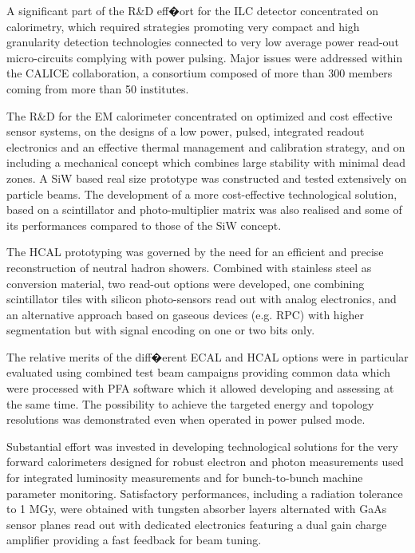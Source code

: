 \documentclass[%
 reprint,
 amsmath,amssymb,
 aps,
]{revtex4-1}
\begin{document}
A significant part of the R\&D eff�ort for the ILC detector concentrated on calorimetry, which required strategies promoting very compact and high granularity detection technologies connected to very low average power read-out micro-circuits complying with power pulsing. Major issues were addressed within the CALICE collaboration, a consortium composed of more than 300 members coming from more than 50 institutes.

The R\&D for the EM calorimeter concentrated on optimized and cost effective sensor systems, on the designs of a low power, pulsed, integrated readout electronics and an effective thermal management and calibration strategy, and on including a mechanical concept which combines large stability with minimal dead zones. A SiW based real size prototype was constructed and tested extensively on particle beams. The development of a more cost-effective technological solution, based on a scintillator and photo-multiplier matrix was also realised and some of its performances compared to those of the SiW concept.

The HCAL prototyping was governed by the need for an efficient and precise reconstruction of neutral hadron showers. Combined with stainless steel as conversion material, two read-out options were developed, one combining scintillator tiles with silicon photo-sensors read out with analog electronics, and an alternative approach based on gaseous devices (e.g. RPC) with higher segmentation but with signal encoding on one or two bits only.

The relative merits of the diff�erent ECAL and HCAL options were in particular evaluated using combined test beam campaigns providing common data which were processed with PFA software which it allowed developing and assessing at the same time. The possibility to achieve the targeted energy and topology resolutions was demonstrated even when operated in power pulsed mode.

Substantial effort was invested in developing technological solutions for the very forward calorimeters designed for robust electron and photon measurements used for integrated luminosity measurements and for bunch-to-bunch machine parameter monitoring. Satisfactory performances, including a radiation tolerance to 1 MGy, were obtained with tungsten absorber layers alternated with GaAs sensor planes read out with dedicated electronics featuring a dual gain charge amplifier providing a fast feedback for beam tuning.
\end{document}
